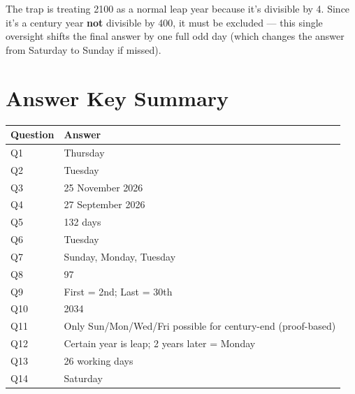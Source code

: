 \documentclass[11pt]{article}
\begin{document}
\begin{warnbox}
The trap is treating 2100 as a normal leap year because it's divisible by 4. Since it's a century
year \textbf{not} divisible by 400, it must be excluded --- this single oversight shifts the final
answer by one full odd day (which changes the answer from Saturday to Sunday if missed).
\end{warnbox}

\section*{Answer Key Summary}
\begin{center}
\begin{tabular}{ll}
\toprule
\textbf{Question} & \textbf{Answer} \\
\midrule
Q1 & Thursday \\
Q2 & Tuesday \\
Q3 & 25 November 2026 \\
Q4 & 27 September 2026 \\
Q5 & 132 days \\
Q6 & Tuesday \\
Q7 & Sunday, Monday, Tuesday \\
Q8 & 97 \\
Q9 & First = 2nd; Last = 30th \\
Q10 & 2034 \\
Q11 & Only Sun/Mon/Wed/Fri possible for century-end (proof-based) \\
Q12 & Certain year is leap; 2 years later = Monday \\
Q13 & 26 working days \\
Q14 & Saturday \\
\bottomrule
\end{tabular}
\end{center}
\end{document}
